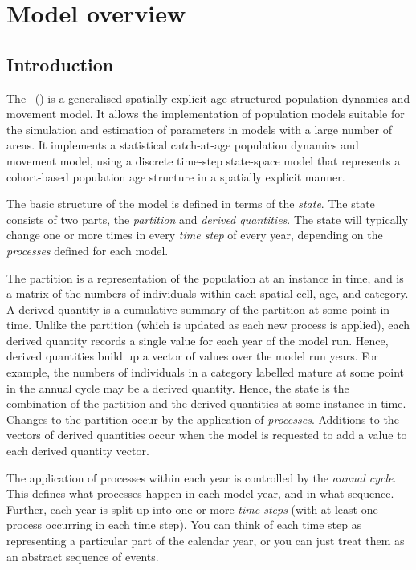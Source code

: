 \section{Model overview\label{sec:overview}}

\subsection{Introduction}

The \SPMName\ (\SPM) is a generalised spatially explicit age-structured population dynamics and movement model. It allows the implementation of population models suitable for the simulation and estimation of parameters in models with a large number of areas. It implements a statistical catch-at-age population dynamics and movement model, using a discrete time-step state-space model that represents a cohort-based population age structure in a spatially explicit manner. 

The basic structure  of the model is defined in terms of the \emph{state}. The state consists of two parts, the \emph{partition} and \emph{derived quantities}. The state will typically change one or more times in every \emph{time step} of every year, depending on the \emph{processes} defined for each model. 

 The partition is a representation of the population at an instance in time, and is a matrix of the numbers of individuals within each spatial cell, age, and category. A derived quantity is a cumulative summary of the partition at some point in time. Unlike the partition (which is updated as each new process is applied), each derived quantity records a single value for each year of the model run. Hence, derived quantities build up a vector of values over the model run years. For example, the numbers of individuals in a category labelled mature at some point in the annual cycle may be a derived quantity. Hence, the state is the combination of the partition and the derived quantities at some instance in time. Changes to the partition occur by the application of \emph{processes}. Additions to the vectors of derived quantities occur when the model is requested to add a value to each derived quantity vector. 

The application of processes within each year is controlled by the \emph{annual cycle}. This defines what processes happen in each model year, and in what sequence. Further, each year is split up into one or more \emph{time steps} (with at least one process occurring in each time step). You can think of each time step as representing a particular part of the calendar year, or you can just treat them as an abstract sequence of events.

